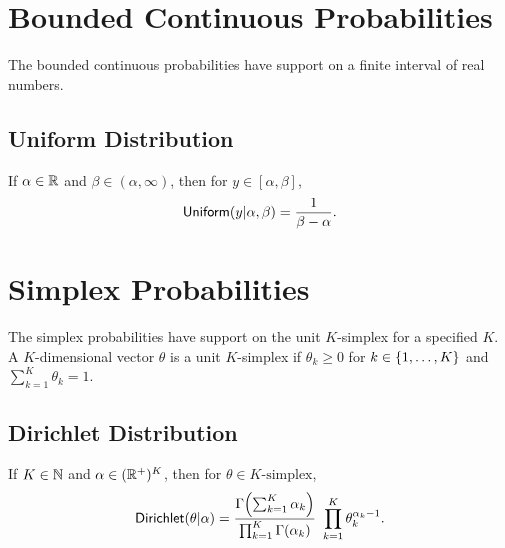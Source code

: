 \begin{description}
%
%
\end{description}

\section{Bounded Continuous Probabilities}

The bounded continuous probabilities have support on a finite interval
of real numbers.

\subsection{Uniform Distribution}

If $\alpha \in \mathbb{R}$ and $\beta \in (\alpha,\infty)$, then for $y
\in [\alpha,\beta]$,
\[
\mbox{\sf Uniform}(y|\alpha,\beta)
= 
\frac{1}{\beta - \alpha}
.
\]

\begin{description}
\end{description}

\section{Simplex Probabilities}

The simplex probabilities have support on the unit $K$-simplex for a
specified $K$.  A $K$-dimensional vector $\theta$ is a unit
$K$-simplex if $\theta_k \geq 0$ for $k \in \{ 1,\ldots,K \}$ and
$\sum_{k = 1}^K \theta_k = 1$.

\subsection{Dirichlet Distribution}

If $K \in \mathbb{N}$ and $\alpha \in (\mathbb{R}^+)^{K}$, then for
$\theta \in \mbox{$K$-simplex}$, 
\[
\mbox{\sf Dirichlet}(\theta|\alpha)
= 
\frac{\Gamma \! \left( \sum_{k=1}^K \alpha_k \right)}
     {\prod_{k=1}^K \Gamma(\alpha_k)}
\
\prod_{k=1}^K \theta_k^{\alpha_k - 1}
.
\]

